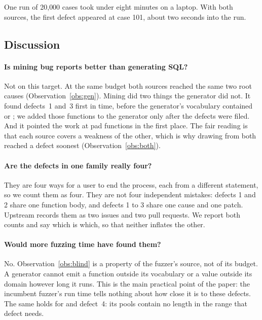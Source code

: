 \begin{observation}
\label{obs:cost}
One run of 20{,}000 cases took under eight minutes on a laptop. With both sources,
the first defect appeared at case 101, about two seconds into the run.
\end{observation}

\subsection{Discussion}
\label{sec:discussion}

\paragraph{Is mining bug reports better than generating SQL?} Not on this
target. At the same budget both sources reached the same two root causes
(Observation~\ref{obs:gen}). Mining did two things the generator did not. It
found defects~1 and~3 first in time, before the generator's vocabulary contained
 or ; we added those functions to the generator only after
the defects were filed. And it pointed the work at pad functions in the first
place. The fair reading is that each source covers a weakness of the other, which
is why drawing from both
reached a defect soonest (Observation~\ref{obs:both}).

\paragraph{Are the defects in one family really four?} They are four ways for a
user to end the process, each from a different statement, so we count them as
four. They are not four independent mistakes: defects 1 and 2 share one
function body, and defects 1 to 3 share one cause and one patch. Upstream records
them as two issues and two pull requests. We report both counts and say which is
which, so that neither inflates the other.

\paragraph{Would more fuzzing time have found them?} No.
Observation~\ref{obs:blind} is a property of the fuzzer's source, not of its
budget. A generator cannot emit a function outside its vocabulary or a value
outside its domain however long it runs. This is the main practical point of the
paper: the incumbent fuzzer's run time tells nothing about how close it is to
these defects. The same holds for \tool and defect~4:
its pools contain no length in the range that defect needs.

